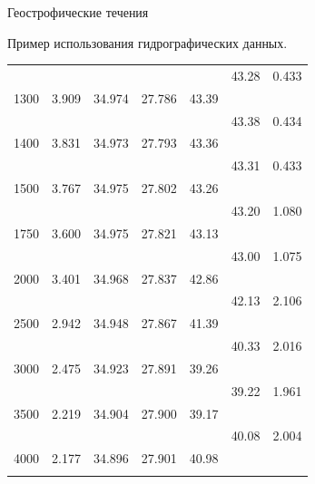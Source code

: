 \begin{chapter}{Геострофические течения}
\begin{section}{Пример использования гидрографических данных.}
\begin{table}[t!]
\begin{small}
\begin{center}
\begin{tabular}{rrrrrrl}
 &            &       &       &       &     43.28&  0.433\\
1300&   3.909&  34.974& 27.786& 43.39&\\
 &            &       &       &       &     43.38&  0.434\\
1400&   3.831&  34.973& 27.793& 43.36&\\
 &            &       &       &       &     43.31&  0.433\\
1500&   3.767&  34.975& 27.802& 43.26&\\
 &            &       &       &       &     43.20&  1.080\\
1750&   3.600&  34.975& 27.821& 43.13&\\
 &            &       &       &       &     43.00&  1.075\\
2000&   3.401&  34.968& 27.837& 42.86&\\
 &            &       &       &       &     42.13&  2.106\\
2500&   2.942&  34.948& 27.867& 41.39&\\
 &            &       &       &       &     40.33&  2.016\\
3000&   2.475&  34.923& 27.891& 39.26&\\
 &            &       &       &       &     39.22&  1.961\\
3500&   2.219&  34.904& 27.900& 39.17&\\
 &            &       &       &       &     40.08&  2.004\\
4000&   2.177&  34.896& 27.901& 40.98  \\
\rule[-1ex]{0mm}{1ex}&  \\
\hline
\end{tabular} \\
\end{center}
\end{small}
\end{table}


\end{section}
\end{chapter}
